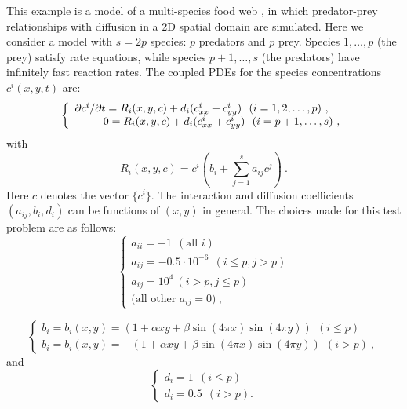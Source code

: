 \documentclass[11pt]{article}
\begin{document}
This example is a model of a multi-species food web \cite{Br86}, in
which predator-prey relationships with diffusion in a 2D spatial
domain are simulated.  Here we consider a model with $s = 2p$ species:
$p$ predators and $p$ prey.  Species $1,\ldots, p$ (the prey) satisfy
rate equations, while species $p+1,\ldots, s$ (the predators) have
infinitely fast reaction rates.  The coupled PDEs for the species
concentrations $c^i(x,y,t)$ are:
\begin{equation}
\left\{ \begin{array}{l}
               \partial c^i / \partial t = R_i(x,y,c) + d_i 
( c^i_{xx} + c^i_{yy} ) ~ ~ (i = 1,2,\ldots,p) ~, \\
                \hspace*{.36in}        0 = R_i(x,y,c) + d_i 
( c^i_{xx} + c^i_{yy} ) ~ ~ (i = p+1,\ldots,s) ~,
\end{array} \right.                                       \label{ppsys}
\end{equation}
with
\[
R_i(x,y,c) = c^i (b_i + \sum_{j=1}^s a_{ij} c^j) ~.
\]
Here $c$ denotes the vector $\{c^i\}$.
The interaction and diffusion coefficients $(a_{ij},b_i,d_i)$ can be
functions of $(x,y)$ in general. The choices made for this test
problem are as follows:
\[
\left\{ \begin{array}{l}
a_{ii} = -1 ~ ~ (\mbox{all } i) \\
a_{ij} = -0.5 \cdot 10^{-6} ~ ~ ( i \leq p , j > p ) \\
a_{ij} = 10^4 ~ ( i > p , j \leq p ) \\
\mbox{(all other } a_{ij} = 0 ) ~,
\end{array} \right.
\]

\[
\left\{ \begin{array}{l}
b_i = b_i(x,y) =  (1 + \alpha xy + \beta \sin(4\pi x)\sin(4\pi y) )
                   ~~ ( i \leq p ) \\
b_i = b_i(x,y) = -(1 + \alpha xy + \beta \sin(4\pi x)\sin(4\pi y) )
                   ~~ ( i > p ) ~,
\end{array} \right.
\]
and
\[
\left\{ \begin{array}{l}
d_i =   1 ~ ~ ( i \leq p ) \\
d_i = 0.5 ~ ~ ( i > p ) .
\end{array} \right.
\]
\end{document}
